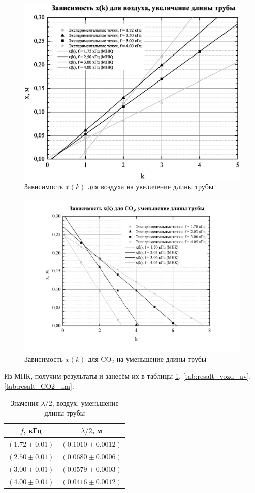 \documentclass[a4paper,12pt]{article}
\begin{document}
\begin{figure}
	\centering
	\includegraphics[width=0.8\linewidth]{uv_vozd}
	\caption{Зависимость $x(k)$ для воздуха на увеличение длины трубы}
	\label{fig:uvvozd}
\end{figure}

\begin{figure}
	\centering
	\includegraphics[width=0.8\linewidth]{um_co2}
	\caption{Зависимость $x(k)$ для CO$_2$ на уменьшение длины трубы}
	\label{fig:um_co2}
\end{figure}

Из МНК, получим результаты и занесём их в таблицы \ref{tab:resalt_vozd_um}, \ref{tab:resalt_vozd_uv}, \ref{tab:resalt_CO2_um}. 

\begin{table}[h]
	\centering
	\caption{Значения $\lambda /2$, воздух, уменьшение длины трубы}
	\label{tab:resalt_vozd_um}
\begin{tabular}{|c|c|}
	\hline 
	$f$, кГц & $\lambda /2$, м \\ 
	\hline 
	$(1.72\pm0.01)$ & $(0.1010\pm0.0012)$ \\ 
	\hline 
	$(2.50\pm0.01)$ & $(0.0680\pm0.0006)$ \\ 
	\hline 
	$(3.00\pm0.01)$ & $(0.0579\pm0.0003)$ \\ 
	\hline 
	$(4.00\pm0.01)$ & $(0.0416\pm0.0012)$ \\ 
	\hline 
\end{tabular} 
\end{table}
\end{document}
